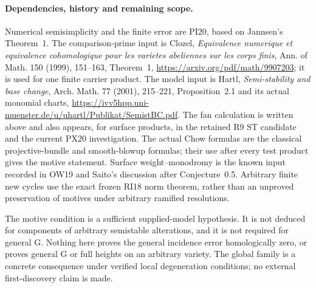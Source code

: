 \paragraph{Dependencies, history and remaining scope.}
Numerical semisimplicity and the finite error are PI20, based
on Jannsen's Theorem~1.  The comparison-prime input is Clozel,
\emph{Equivalence numerique et equivalence cohomologique pour
les varietes abeliennes sur les corps finis}, Ann. of Math.
150 (1999), 151--163, Theorem~1,
\url{https://arxiv.org/pdf/math/9907203}; it is used for one
finite carrier product.  The model input is Hartl,
\emph{Semi-stability and base change}, Arch. Math.
77 (2001), 215--221, Proposition~2.1 and its actual monomial
charts, \url{https://ivv5hpp.uni-muenster.de/u/uhartl/Publikat/SemistBC.pdf}.
The fan calculation is written above and also appears, for
surface products, in the retained R9 ST candidate and the
current PX20 investigation.  The actual Chow formulas are
the classical projective-bundle and smooth-blowup formulas;
their use after every test product gives the motive statement.
Surface weight--monodromy is the known input recorded in OW19
and Saito's discussion after Conjecture~0.5.  Arbitrary finite
new cycles use the exact frozen RI18 norm theorem, rather
than an unproved preservation of motives under arbitrary
ramified resolutions.

The motive condition is a sufficient supplied-model hypothesis.
It is not deduced for components of arbitrary semistable
alterations, and it is not required for general G.  Nothing
here proves the general incidence error homologically zero,
or proves general G or full heights on an arbitrary variety.
The global family is a concrete consequence under verified
local degeneration conditions; no external first-discovery
claim is made.

